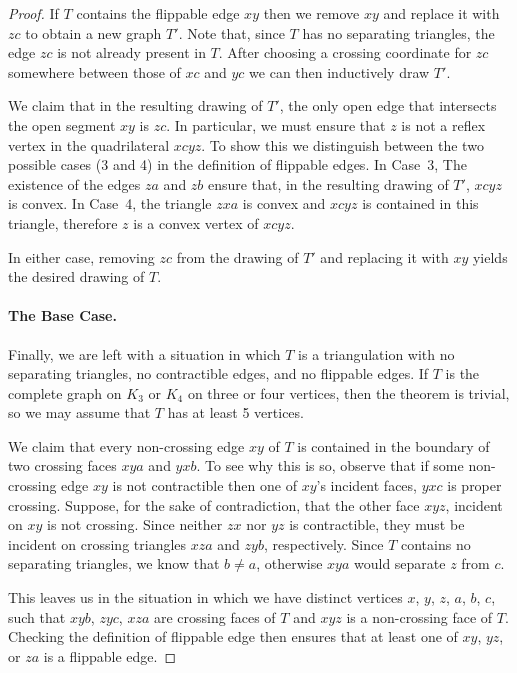 \documentclass{patmorin}
\begin{document}
\begin{proof}
   If $T$ contains the flippable edge $xy$ then we remove $xy$ and
   replace it with $zc$ to obtain a new graph $T'$.
   Note that, since $T$ has no separating triangles, the edge $zc$
   is not already present in $T$.
   After choosing a crossing coordinate for $zc$ somewhere
   between those of $xc$ and $yc$ we can then inductively draw $T'$.  

   We claim that in the resulting drawing of $T'$, the only open edge
   that intersects the open segment $xy$ is $zc$.  In particular, we must
   ensure that $z$ is not a reflex vertex in the quadrilateral $xcyz$.
   To show this we distinguish between the two possible cases (3 and 4)
   in the definition of flippable edges. In Case~3, The existence of the
   edges $za$ and $zb$ ensure that, in the resulting drawing of $T'$,
   $xcyz$ is convex.  In Case~4, the triangle $zxa$ is convex and $xcyz$
   is contained in this triangle, therefore $z$ is a convex vertex
   of $xcyz$.

   In either case, removing $zc$ from the drawing of $T'$ and replacing
   it with $xy$ yields the desired drawing of $T$.

   \paragraph{The Base Case.}

   Finally, we are left with a situation in which $T$ is a triangulation
   with no separating triangles, no contractible edges, and no flippable
   edges.  
   If $T$ is the complete graph on $K_3$ or $K_4$ on three or four
   vertices, then the theorem is trivial, so we may assume that $T$
   has at least 5 vertices.

   We claim that every non-crossing edge $xy$ of $T$ is contained in the
   boundary of two crossing faces $xya$ and $yxb$.  To see why this is so,
   observe that if some non-crossing edge $xy$ is not contractible then
   one of $xy$'s incident faces, $yxc$ is proper crossing.  Suppose, for
   the sake of contradiction, that the other face $xyz$, incident on $xy$
   is not crossing.  Since neither $zx$ nor $yz$ is contractible, they
   must be incident on crossing triangles $xza$ and $zyb$, respectively.
   Since $T$ contains no separating triangles, we know that $b\neq a$,
   otherwise $xya$ would separate $z$ from $c$.

   This leaves us in the situation in which we have distinct vertices $x$,
   $y$, $z$, $a$, $b$, $c$, such that $xyb$, $zyc$, $xza$ are crossing
   faces of $T$ and $xyz$ is a non-crossing face of $T$.  Checking the
   definition of flippable edge then ensures that at least one of $xy$,
   $yz$, or $za$ is a flippable edge.


\end{proof}
\end{document}

